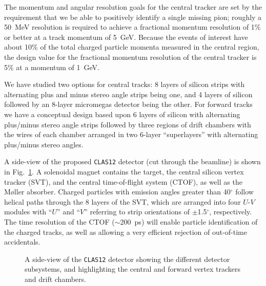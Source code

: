 The momentum and angular resolution goals for the central tracker are set 
by the requirement that we be able to positively identify a single missing 
pion; roughly a 50~MeV resolution is required to achieve a fractional momentum 
resolution of 1\% or better at a track momentum of 5~GeV. Because the events 
of interest have about 10\% of the total charged particle momenta measured 
in the central region, the design value for the fractional momentum 
resolution of the central tracker is 5\% at a momentum of 1~GeV.  

We have studied two options for central tracks: 8 layers of silicon strips 
with alternating plus and minus stereo angle strips being one, and 4 
layers of silicon followed by an 8-layer micromegas detector being the 
other.  For forward tracks we have a conceptual design based upon 6 layers 
of silicon with alternating plus/minus stereo angle strips followed by 
three regions of drift chambers with the wires of each chamber arranged in 
two 6-layer ``superlayers'' with alternating plus/minus stereo angles.

A side-view of the proposed {\tt CLAS12} detector (cut through the beamline) 
is shown in Fig.~\ref{clas12side}.  A solenoidal magnet contains the 
target, the central silicon vertex tracker (SVT), and the central 
time-of-flight system (CTOF), as well as the M{\o}ller absorber.  Charged 
particles with emission angles greater than 40$^{\circ}$ follow helical 
paths through the 8 layers of the SVT, which are arranged into four $U$-$V$ 
modules with ``$U$'' and ``$V$'' referring to strip orientations of 
$\pm$1.5$^{\circ}$, respectively.  The time resolution of the CTOF 
($\sim$200~ps) will enable particle identification of the charged tracks, 
as well as allowing a very efficient rejection of out-of-time accidentals.

\begin{figure}[htbp]
\vspace{12.0cm}
\caption{\small{A side-view of the {\tt CLAS12} detector showing the
different detector subsystems, and highlighting the central and forward
vertex trackers and drift chambers.}}
\label{clas12side}
\end{figure}

